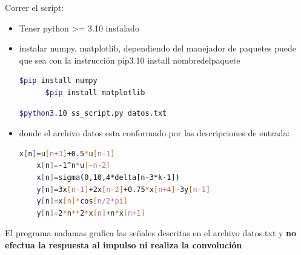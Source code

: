 \documentclass[11pt]{article}
\begin{document}
  Correr el script:
  \begin{itemize}
  \item Tener python >= 3.10 instalado
  \item instalar numpy, matplotlib, dependiendo del manejador de paquetes puede que sea con la instrucción pip3.10 install nombredelpaquete
    \begin{lstlisting}[language=Bash, caption=instalar dependencias]
      $pip install numpy
      $pip install matplotlib
  \end{lstlisting}
  \begin{lstlisting}[language=Bash, caption=Correr el programa]
    $python3.10 ss_script.py datos.txt
  \end{lstlisting}

  \item donde el archivo datos esta conformado por las descripciones de entrada:
  \begin{lstlisting}[language=Bash, caption=Archivo con datos]
    x[n]=u[n+3]+0.5*u[n-1]
    x[n]=-1^n*u[-n-2]
    x[n]=sigma(0,10,4*delta[n-3*k-1])
    y[n]=3x[n-1]+2x[n-2]+0.75*x[n+4]-3y[n-1]
    y[n]=x[n]*cos[n/2*pi]
    y[n]=2*n**2*x[n]+n*x[n+1]
  \end{lstlisting}
  \end{itemize}

  \begin{tcolorbox}[width=\textwidth,colback={red},title={**NOTA**},outer arc=0mm,colupper=white]    
    El programa nadamas grafica las señales descritas en el archivo datos.txt y \textbf{no efectua la respuesta al impulso ni realiza la convolución}  
  \end{tcolorbox}   

  
  \newpage
  

    
\end{document}
